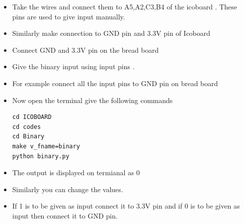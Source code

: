\documentclass[journal,12pt,twocolumn]{IEEEtran}
\begin{document}
\begin{itemize}
\item Take the wires and connect them to A5,A2,C3,B4 of the icoboard . These pins are used to give input manually.\\
\item Similarly make connection to GND pin and 3.3V pin of Icoboard\\
\item Connect GND and 3.3V pin on the bread board\\
\item Give the binary input using input pins .\\
\item For example connect all the input pins to GND pin on bread board\\
\item Now open the terminal give the following commands\\
\begin{lstlisting}
cd ICOBOARD
cd codes
cd Binary
make v_fname=binary
python binary.py
\end{lstlisting} 
\item The output is displayed on termianal as 0\\
\item Similarly you can change the values.
\item  If 1 is to be given as input connect it to 3.3V pin and if 0 is to be given as input then connect it to GND pin.
\end{itemize}
\end{document}
